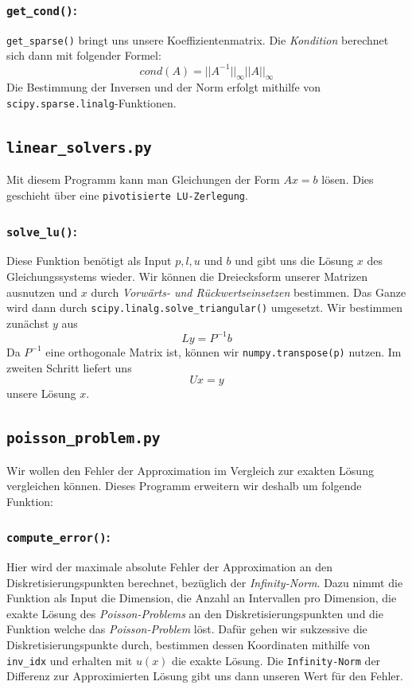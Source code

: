 \documentclass[smallheadings]{scrartcl}
\theoremstyle{definition}
\begin{document}
\subsubsection*{\texttt{get\_cond()}:}
\texttt{get\_sparse()} bringt uns unsere Koeffizientenmatrix. Die \textit{Kondition} berechnet sich dann mit folgender Formel:
$$
cond(A)=||A^{-1}||_{\infty}||A||_{\infty}
$$
Die Bestimmung der Inversen und der Norm erfolgt mithilfe von 
\texttt{scipy.sparse.linalg}-Funktionen.



\subsection{\texttt{linear\_solvers.py}}
Mit diesem Programm kann man Gleichungen der Form $Ax=b$ lösen. Dies geschieht über eine \texttt{pivotisierte LU-Zerlegung}.

\subsubsection*{\texttt{solve\_lu()}:}
Diese Funktion benötigt als Input $p , l , u$ und $b$ und gibt uns die Lösung $x$ des Gleichungssystems wieder.
Wir können die Dreiecksform unserer Matrizen ausnutzen und $x$ durch \textit{Vorwärts- und Rückwertseinsetzen} bestimmen. Das Ganze wird dann durch \texttt{scipy.linalg.solve\_triangular()} umgesetzt.
Wir bestimmen zunächst $y$ aus
$$
Ly = P^{-1}b
$$
Da $P^{-1}$ eine orthogonale Matrix ist, können wir \texttt{numpy.transpose(p)} nutzen.
Im zweiten Schritt liefert uns
$$
Ux=y
$$
unsere Lösung $x$.

\subsection{\texttt{poisson\_problem.py}}
Wir wollen den Fehler der Approximation im Vergleich zur exakten Lösung vergleichen können. Dieses Programm erweitern wir deshalb um folgende Funktion:

\subsubsection*{\texttt{compute\_error()}:}
Hier wird der maximale absolute Fehler der Approximation an den Diskretisierungspunkten berechnet, bezüglich der \textit{Infinity-Norm}. Dazu nimmt die Funktion als Input die Dimension, die Anzahl an Intervallen pro Dimension, die exakte Lösung des \textit{Poisson-Problems} an den Diskretisierungspunkten und die Funktion welche das \textit{Poisson-Problem} löst.
Dafür gehen wir sukzessive die Diskretisierungspunkte durch, bestimmen dessen Koordinaten mithilfe von \texttt{inv\_idx} und erhalten mit $u(x)$ die exakte Lösung. 
Die \texttt{Infinity-Norm} der Differenz zur Approximierten Lösung gibt uns dann unseren Wert für den Fehler.
\end{document}
